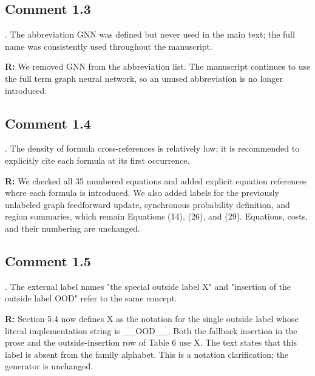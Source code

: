 \documentclass[11pt,a4paper]{article}
\newenvironment{reviewercomment}{%
  \begin{list}{}{\setlength{\leftmargin}{1.5em}%
    \setlength{\rightmargin}{0pt}\setlength{\topsep}{0.5em}}%
  \item\relax\color{reviewerred}\ignorespaces
}{\end{list}}
\begin{document}
\subsection*{Comment 1.3}

\begin{reviewercomment}3. The abbreviation GNN was defined but never used in the main text; the full name was consistently used throughout the manuscript.\end{reviewercomment}

{\color{black}\textbf{R:} We removed GNN from the abbreviation list. The manuscript continues to use the full term graph neural network, so an unused abbreviation is no longer introduced.\par}

\subsection*{Comment 1.4}

\begin{reviewercomment}4. The density of formula cross-references is relatively low; it is recommended to explicitly cite each formula at its first occurrence.\end{reviewercomment}

{\color{black}\textbf{R:} We checked all 35 numbered equations and added explicit equation references where each formula is introduced. We also added labels for the previously unlabeled graph feedforward update, synchronous probability definition, and region summaries, which remain Equations (14), (26), and (29). Equations, costs, and their numbering are unchanged.\par}

\subsection*{Comment 1.5}

\begin{reviewercomment}5. The external label names "the special outside label X" and "insertion of the outside label OOD" refer to the same concept.\end{reviewercomment}

{\color{black}\textbf{R:} Section 5.4 now defines X as the notation for the single outside label whose literal implementation string is \_\_OOD\_\_. Both the fallback insertion in the prose and the outside-insertion row of Table 6 use X. The text states that this label is absent from the family alphabet. This is a notation clarification; the generator is unchanged.\par}
\end{document}
